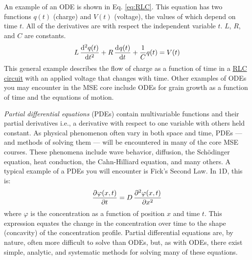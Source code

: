 An example of an ODE is shown in Eq. \ref{eq:RLC}. This equation has two functions $q(t)$ (charge) and $V(t)$ (voltage), the values of which depend on time $t$. All of the derivatives are with respect the independent variable $t$. $L$, $R$, and $C$ are constants.
%
\begin{align}	
	L \mathop{}\!\frac{\mathrm{d}^{2}{q(t)}}{\mathrm{d}{t}^{2}} + R \mathop{}\!\frac{\mathrm{d}^{}{q(t)}}{\mathrm{d}{t}^{}} + \frac{1}{C} q(t) = V(t) \label{eq:RLC}
\end{align}
%
This general example describes the flow of charge as a function of time in a \href{https://en.wikipedia.org/wiki/RLC_circuit}{RLC circuit} with an applied voltage that changes with time. Other examples of ODEs you may encounter in the MSE core include ODEs for grain growth as a function of time and the equations of motion.

\emph{Partial differential equations} (PDEs) contain multivariable functions and their partial derivatives i.e., a derivative with respect to one variable with others held constant. As physical phenomenon often vary in both space and time, PDEs --- and methods of solving them --- will be encountered in many of the core MSE courses. These phenomena include wave behavior, diffusion, the Sch\"odinger equation, heat conduction, the Cahn-Hilliard equation, and many others. A typical example of a PDEs you will encounter is Fick's Second Law. In 1D, this is:
%
\begin{align}
	\mathop{}\!\frac{\partial^{}{\varphi(x,t)}}{\partial{t}^{}} = D\mathop{}\!\frac{\partial^{2}{\varphi(x,t)}}{\partial{x}^{2}} \label{eq:Ficks2}
\end{align}
%
where $\varphi$ is the concentration as a function of position $x$ and time $t$. This expression equates the change in the concentration over time to the shape (concavity) of the concentration profile. Partial differential equations are, by nature, often more difficult to solve than ODEs, but, as with ODEs, there exist simple, analytic, and systematic methods for solving many of these equations.
